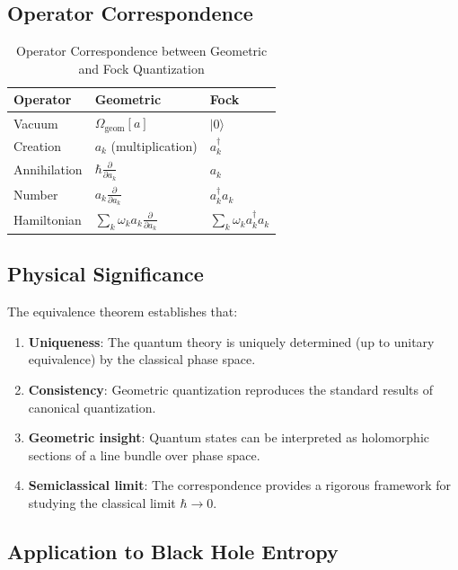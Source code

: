 \subsection{Operator Correspondence}

\begin{table}[h]
\centering
\caption{Operator Correspondence between Geometric and Fock Quantization}
\begin{tabular}{|l|l|l|}
\hline
\textbf{Operator} & \textbf{Geometric} & \textbf{Fock} \\
\hline
Vacuum & $\Omega_{\text{geom}}[a]$ & $|0\rangle$ \\
Creation & $a_k$ (multiplication) & $a_k^\dagger$ \\
Annihilation & $\hbar \frac{\partial}{\partial a_k}$ & $a_k$ \\
Number & $a_k \frac{\partial}{\partial a_k}$ & $a_k^\dagger a_k$ \\
Hamiltonian & $\sum_k \omega_k a_k \frac{\partial}{\partial a_k}$ & $\sum_k \omega_k a_k^\dagger a_k$ \\
\hline
\end{tabular}
\end{table}

\subsection{Physical Significance}

The equivalence theorem establishes that:

\begin{enumerate}
    \item \textbf{Uniqueness}: The quantum theory is uniquely determined (up to unitary equivalence) by the classical phase space.
    
    \item \textbf{Consistency}: Geometric quantization reproduces the standard results of canonical quantization.
    
    \item \textbf{Geometric insight}: Quantum states can be interpreted as holomorphic sections of a line bundle over phase space.
    
    \item \textbf{Semiclassical limit}: The correspondence provides a rigorous framework for studying the classical limit $\hbar \to 0$.
\end{enumerate}

\subsection{Application to Black Hole Entropy}

